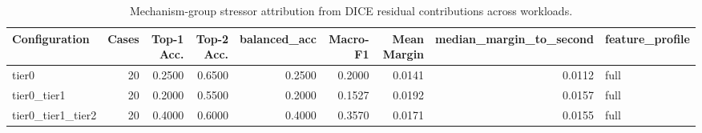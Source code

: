 \begin{table}[t]
\centering
\caption{Mechanism-group stressor attribution from DICE residual contributions across workloads.}
\label{tab:dice_stressor_diagnosis}
\footnotesize
\begin{tabular}{lrrrrrrrl}
\toprule
Configuration & Cases & Top-1 Acc. & Top-2 Acc. & balanced_acc & Macro-F1 & Mean Margin & median_margin_to_second & feature_profile \\
\midrule
tier0 & 20 & 0.2500 & 0.6500 & 0.2500 & 0.2000 & 0.0141 & 0.0112 & full \\
tier0_tier1 & 20 & 0.2000 & 0.5500 & 0.2000 & 0.1527 & 0.0192 & 0.0157 & full \\
tier0_tier1_tier2 & 20 & 0.4000 & 0.6000 & 0.4000 & 0.3570 & 0.0171 & 0.0155 & full \\
\bottomrule
\end{tabular}

\end{table}
